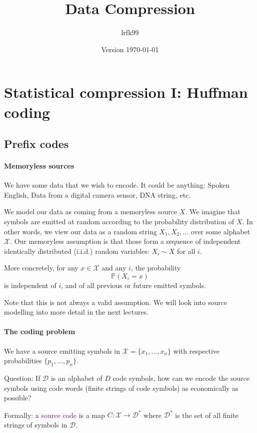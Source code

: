 \documentclass[a4paper, 11pt, openany]{article}
\title{Data Compression}
\date{Version \today}
\author{lrfk99}
\numberwithin{equation}{section}
\theoremstyle{plain}
\theoremstyle{definition}
\newcommand{\probability}{\mathbb{P}}
\newcommand{\Define}[1]{\textcolor{purple}{#1}}
\begin{document}
\maketitle


\section{Statistical compression I: Huffman coding}
\label{sec:01}


\subsection{Prefix codes}

\paragraph{Memoryless sources}

We have some data that we wish to encode. It could be anything: Spoken English, Data from a digital camera sensor, DNA string, etc.

We model our data as coming from a memoryless source $X$. We imagine that symbols are emitted at random according to the probability distribution of $X$. In other words, we view our data as a random string $X_1, X_2, \dots$ over some alphabet $\mathcal{X}$. Our memoryless assumption is that those form a sequence of independent identically distributed (i.i.d.) random variables: $X_i \sim X$ for all $i$.

More concretely, for any $x \in \mathcal{X}$ and any $i$, the probability 
\[
    \probability(X_i = x)
\]
is independent of $i$, and of all previous or future emitted symbols.

Note that this is not always a valid assumption. We will look into source modelling into more detail in the next lectures.

\paragraph{The coding problem}

We have a source emitting symbols in $\mathcal{X} = \{x_1, \dots, x_n\}$ with respective probabilities  $\{p_1, \dots, p_n\}$.

Question: If  $\mathcal{D}$ is an alphabet of  $D$ code symbols, how can we encode the source symbols using code words (finite strings of code symbols) as economically as possible?

Formally: a \Define{source code} is a map $C : \mathcal{X} \to \mathcal{D}^*$
where  $\mathcal{D}^*$     is the set of all finite strings of symbols in  $\mathcal{D}$.
\end{document}
